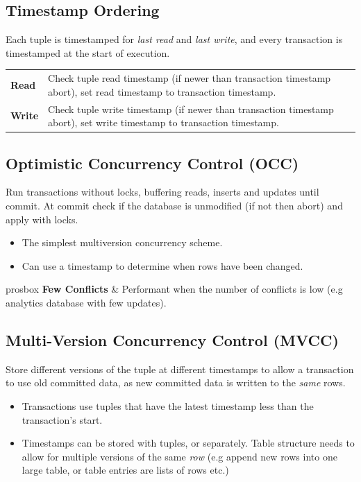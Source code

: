 \subsection{Timestamp Ordering}
Each tuple is timestamped for \textit{last read} and \textit{last write}, and every transaction is timestamped at the start of execution.
\begin{center}
    \begin{tabular}{l p{}}
        \textbf{Read}  & Check tuple read timestamp (if newer than transaction timestamp abort), set read timestamp to transaction timestamp.   \\
        \textbf{Write} & Check tuple write timestamp (if newer than transaction timestamp abort), set write timestamp to transaction timestamp. \\
    \end{tabular}
\end{center}

\subsection{Optimistic Concurrency Control (OCC)}
Run transactions without locks, buffering reads, inserts and updates until commit. At commit check if the database is unmodified (if not then abort) and apply with locks.
\begin{itemize}
    \item The simplest multiversion concurrency scheme.
    \item Can use a timestamp to determine when rows have been changed.
\end{itemize}

\begin{tabbox}{prosbox}
    \textbf{Few Conflicts} & Performant when the number of conflicts is low (e.g analytics database with few updates). \\
\end{tabbox}

\subsection{Multi-Version Concurrency Control (MVCC)}
Store different versions of the tuple at different timestamps to allow a transaction to use old committed data, as new committed data is written to the \textit{same} rows.
\begin{itemize}
    \item Transactions use tuples that have the latest timestamp less than the transaction's start.
    \item Timestamps can be stored with tuples, or separately. Table structure needs to allow for multiple versions of the same \textit{row} (e.g append new rows into one large table, or table entries are lists of rows etc.)
\end{itemize}

